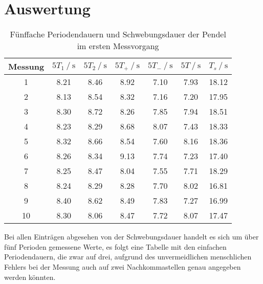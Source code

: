 \section{Auswertung}
\label{sec:Auswertung}


\begin{table}
  \centering
  \caption{Fünffache Periodendauern und Schwebungsdauer der Pendel im ersten Messvorgang}
  \label{tab:Messvorgang 1}
  \begin{tabular}{S[table-format=2.0] S S S S S S[table-format=2.2]}
      \toprule
      {Messung} & {$5T_1 \mathbin{/} \unit{\second}$} & {$5T_2 \mathbin{/} \unit{\second}$} 
      & {$5T_+ \mathbin{/} \unit{\second}$} & {$5T_- \mathbin{/} \unit{\second}$} & {$5T \mathbin{/} \unit{\second}$} & {$T_s \mathbin{/} \unit{\second}$} \\
       & 8.21 & 8.46 & 8.92 & 7.10 & 7.93 & 18.12\\  
       2 & 8.13 & 8.54 & 8.32 & 7.16 & 7.20 & 17.95\\ 
       3 & 8.30 & 8.72 & 8.26 & 7.85 & 7.94 & 18.51\\ 
       4 & 8.23 & 8.29 & 8.68 & 8.07 & 7.43 & 18.33\\ 
       5 & 8.32 & 8.66 & 8.54 & 7.60 & 8.16 & 18.36\\ 
       6 & 8.26 & 8.34 & 9.13 & 7.74 & 7.23 & 17.40\\ 
       7 & 8.25 & 8.47 & 8.04 & 7.55 & 7.71 & 18.29\\ 
       8 & 8.24 & 8.29 & 8.28 & 7.70 & 8.02 & 16.81\\ 
       9 & 8.40 & 8.62 & 8.49 & 7.83 & 7.27 & 16.99\\ 
      10 & 8.30 & 8.06 & 8.47 & 7.72 & 8.07 & 17.47\\ 
      \bottomrule
  \end{tabular}
\end{table}

Bei allen Einträgen abgesehen von der Schwebungsdauer handelt es sich um über fünf Perioden gemessene Werte, es folgt eine Tabelle mit den einfachen Periodendauern, die zwar auf drei,
aufgrund des unvermeidlichen menschlichen Fehlers bei der Messung auch auf zwei Nachkommastellen genau angegeben werden könnten. 
\newpage

